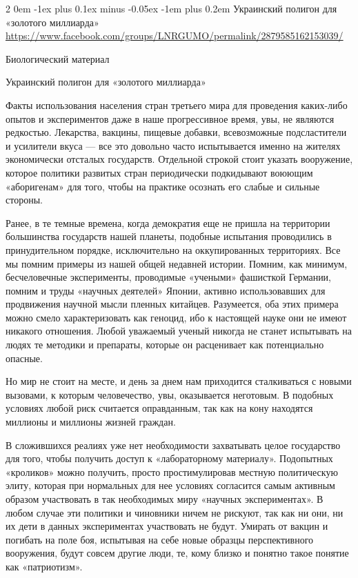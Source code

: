 \documentclass[a4paper,11pt]{extreport}
\makeatletter
\renewcommand\subsection{%
  \clearpage
    \@startsection{subsection}%
    {2}%
    {0em}%
    {-1ex plus 0.1ex minus -0.05ex}%
    {-1em plus 0.2em}%
    {\scshape\bfseries\Large}%
}
\makeatother
\begin{document}
\subsection{Украинский полигон для «золотого миллиарда»}
\label{sec:26_07_2020.fb.lnr.3}
\url{https://www.facebook.com/groups/LNRGUMO/permalink/2879585162153039/}


Биологический материал

Украинский полигон для «золотого миллиарда»

Факты использования населения стран третьего мира для проведения каких-либо
опытов и экспериментов даже в наше прогрессивное время, увы, не являются
редкостью. Лекарства, вакцины, пищевые добавки, всевозможные подсластители и
усилители вкуса --- все это довольно часто испытывается именно на жителях
экономически отсталых государств. Отдельной строкой стоит указать вооружение,
которое политики развитых стран периодически подкидывают воюющим «аборигенам»
для того, чтобы на практике осознать его слабые и сильные стороны.

Ранее, в те темные времена, когда демократия еще не пришла на территории
большинства государств нашей планеты, подобные испытания проводились в
принудительном порядке, исключительно на оккупированных территориях. Все мы
помним примеры из нашей общей недавней истории. Помним, как минимум,
бесчеловечные эксперименты, проводимые «учеными» фашисткой Германии, помним и
труды «научных деятелей» Японии, активно использовавших для продвижения научной
мысли пленных китайцев. Разумеется, оба этих примера можно смело
характеризовать как геноцид, ибо к настоящей науке они не имеют никакого
отношения. Любой уважаемый ученый никогда не станет испытывать на людях те
методики и препараты, которые он расценивает как потенциально опасные.

Но мир не стоит на месте, и день за днем нам приходится сталкиваться с новыми
вызовами, к которым человечество, увы, оказывается неготовым. В подобных
условиях любой риск считается оправданным, так как на кону находятся миллионы и
миллионы жизней граждан.

В сложившихся реалиях уже нет необходимости захватывать целое государство для
того, чтобы получить доступ к «лабораторному материалу». Подопытных «кроликов»
можно получить, просто простимулировав местную политическую элиту, которая при
нормальных для нее условиях согласится самым активным образом участвовать в так
необходимых миру «научных экспериментах». В любом случае эти политики и
чиновники ничем не рискуют, так как ни они, ни их дети в данных экспериментах
участвовать не будут. Умирать от вакцин и погибать на поле боя, испытывая на
себе новые образцы перспективного вооружения, будут совсем другие люди, те,
кому близко и понятно такое понятие как «патриотизм».
\end{document}

